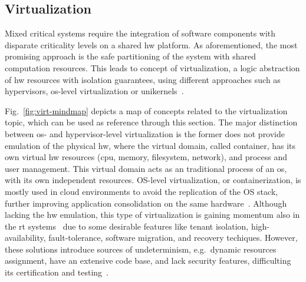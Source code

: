 
\subsection{Virtualization}%
\label{sec:virtualization}
Mixed critical systems require the integration of software components with
disparate criticality levels on a shared \gls{hw} platform. As aforementioned,
the most promising approach is the safe partitioning of the system with shared
computation resources. This leads to concept of virtualization, a logic
abstraction of \gls{hw} resources with isolation guarantees, using different approaches such as
hypervisors, \gls{os}-level virtualization or unikernels~\cite{cinque2022virtualizing}.

Fig.~\ref{fig:virt-mindmap} depicts a map of concepts related to the
virtualization topic, which can be used as reference through this section.
%
The major distinction between \gls{os}- and hypervisor-level virtualization is
the former does not provide emulation of the physical \gls{hw}, where the
virtual domain, called container, has its own virtual \gls{hw} resources
(\gls{cpu}, memory, filesystem, network), and process and user management. This
virtual domain acts as an traditional process of an \gls{os}, with its own
independent resources. OS-level virtualization, or containerization, is mostly
used in cloud environments to avoid the replication of the OS stack, further
improving application consolidation on the same
hardware~\cite{cinque2022virtualizing}. Although lacking the \gls{hw} emulation, this
type of virtualization is gaining momentum also in the \gls{rt} systems~\cite{xilinxRunX,struhar2020real} due to
some desirable features like tenant isolation, high-availability,
fault-tolerance, software migration, and recovery techiques. However, these
solutions introduce sources of undeterminism, e.g.~dynamic resources assignment,
have an extensive code base, and lack security features, difficulting its
certification and testing~\cite{cinque2022virtualizing}.

